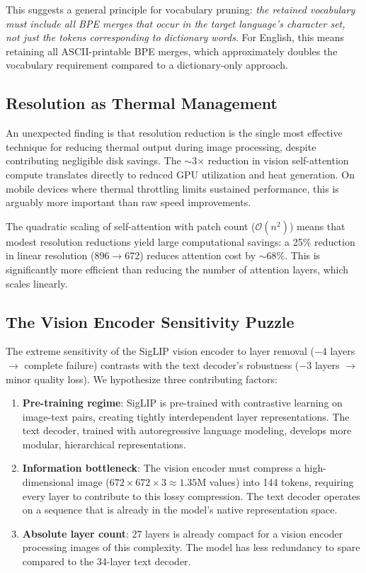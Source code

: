 \documentclass[11pt]{article}
\begin{document}
This suggests a general principle for vocabulary pruning: \emph{the retained vocabulary must include all BPE merges that occur in the target language's character set, not just the tokens corresponding to dictionary words}. For English, this means retaining all ASCII-printable BPE merges, which approximately doubles the vocabulary requirement compared to a dictionary-only approach.

\subsection{Resolution as Thermal Management}

An unexpected finding is that resolution reduction is the single most effective technique for reducing thermal output during image processing, despite contributing negligible disk savings. The $\sim$3$\times$ reduction in vision self-attention compute translates directly to reduced GPU utilization and heat generation. On mobile devices where thermal throttling limits sustained performance, this is arguably more important than raw speed improvements.

The quadratic scaling of self-attention with patch count ($\mathcal{O}(n^2)$) means that modest resolution reductions yield large computational savings: a 25\% reduction in linear resolution (896$\rightarrow$672) reduces attention cost by $\sim$68\%. This is significantly more efficient than reducing the number of attention layers, which scales linearly.

\subsection{The Vision Encoder Sensitivity Puzzle}

The extreme sensitivity of the SigLIP vision encoder to layer removal ($-4$ layers $\rightarrow$ complete failure) contrasts with the text decoder's robustness ($-3$ layers $\rightarrow$ minor quality loss). We hypothesize three contributing factors:

\begin{enumerate}[leftmargin=*]
    \item \textbf{Pre-training regime}: SigLIP is pre-trained with contrastive learning on image-text pairs, creating tightly interdependent layer representations. The text decoder, trained with autoregressive language modeling, develops more modular, hierarchical representations.
    \item \textbf{Information bottleneck}: The vision encoder must compress a high-dimensional image ($672\times672\times3 \approx 1.35$M values) into 144 tokens, requiring every layer to contribute to this lossy compression. The text decoder operates on a sequence that is already in the model's native representation space.
    \item \textbf{Absolute layer count}: 27 layers is already compact for a vision encoder processing images of this complexity. The model has less redundancy to spare compared to the 34-layer text decoder.
\end{enumerate}
\end{document}
